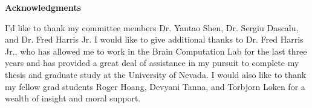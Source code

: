 \newpage
{}
\begin{center}
  \bf {Acknowledgments}
\end{center}

I'd like to thank my committee members Dr. Yantao Shen, Dr. Sergiu Dascalu, and Dr. Fred Harris Jr. I would like to give additional thanks to Dr. Fred Harris Jr., who has allowed me to work in the Brain Computation Lab for the last three years and has provided a great deal of assistance in my pursuit to complete my thesis and graduate study at the University of Nevada. I would also like to thank my fellow grad students Roger Hoang, Devyani Tanna, and Torbjorn Loken for a wealth of insight and moral support.
